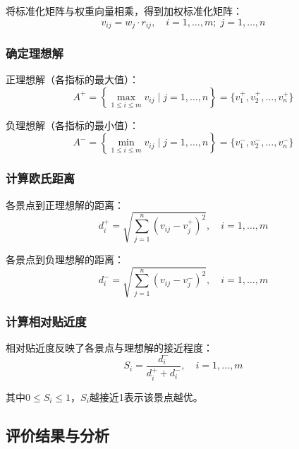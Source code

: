 \documentclass[12pt,a4paper]{ctexart}
\begin{document}
将标准化矩阵与权重向量相乘，得到加权标准化矩阵：
\begin{equation}
\label{eq:weighted}
v_{ij} = w_j \cdot r_{ij}, \quad i=1,\ldots,m; \; j=1,\ldots,n
\end{equation}

\subsubsection{确定理想解}

正理想解（各指标的最大值）：
\begin{equation}
\label{eq:positive}
A^+ = \left\{ \max_{1 \le i \le m} v_{ij} \mid j=1,\ldots,n \right\} = \{v_1^+, v_2^+, \ldots, v_n^+\}
\end{equation}

负理想解（各指标的最小值）：
\begin{equation}
\label{eq:negative}
A^- = \left\{ \min_{1 \le i \le m} v_{ij} \mid j=1,\ldots,n \right\} = \{v_1^-, v_2^-, \ldots, v_n^-\}
\end{equation}

\subsubsection{计算欧氏距离}

各景点到正理想解的距离：
\begin{equation}
\label{eq:dist_pos}
d_i^+ = \sqrt{\sum_{j=1}^{n} (v_{ij} - v_j^+)^2}, \quad i=1,\ldots,m
\end{equation}

各景点到负理想解的距离：
\begin{equation}
\label{eq:dist_neg}
d_i^- = \sqrt{\sum_{j=1}^{n} (v_{ij} - v_j^-)^2}, \quad i=1,\ldots,m
\end{equation}

\subsubsection{计算相对贴近度}

相对贴近度反映了各景点与理想解的接近程度：
\begin{equation}
\label{eq:closeness}
S_i = \frac{d_i^-}{d_i^+ + d_i^-}, \quad i=1,\ldots,m
\end{equation}

其中$0 \le S_i \le 1$，$S_i$越接近1表示该景点越优。

\subsection{评价结果与分析}
\end{document}
